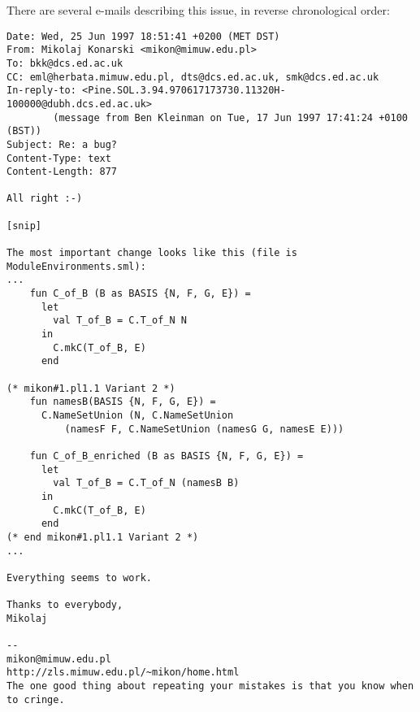 \documentclass[12pt,a4paper]{article}
\begin{document}
There are several e-mails describing this issue, in reverse chronological order:

{\small\begin{verbatim}
Date: Wed, 25 Jun 1997 18:51:41 +0200 (MET DST)
From: Mikolaj Konarski <mikon@mimuw.edu.pl>
To: bkk@dcs.ed.ac.uk
CC: eml@herbata.mimuw.edu.pl, dts@dcs.ed.ac.uk, smk@dcs.ed.ac.uk
In-reply-to: <Pine.SOL.3.94.970617173730.11320H-100000@dubh.dcs.ed.ac.uk>
        (message from Ben Kleinman on Tue, 17 Jun 1997 17:41:24 +0100 (BST))
Subject: Re: a bug?
Content-Type: text
Content-Length: 877

All right :-)

[snip]

The most important change looks like this (file is ModuleEnvironments.sml):
...
    fun C_of_B (B as BASIS {N, F, G, E}) =
      let
        val T_of_B = C.T_of_N N
      in
        C.mkC(T_of_B, E)
      end

(* mikon#1.pl1.1 Variant 2 *)   
    fun namesB(BASIS {N, F, G, E}) =
      C.NameSetUnion (N, C.NameSetUnion 
          (namesF F, C.NameSetUnion (namesG G, namesE E)))

    fun C_of_B_enriched (B as BASIS {N, F, G, E}) =
      let
        val T_of_B = C.T_of_N (namesB B)
      in
        C.mkC(T_of_B, E)
      end
(* end mikon#1.pl1.1 Variant 2 *)
...

Everything seems to work.

Thanks to everybody,
Mikolaj

-- 
mikon@mimuw.edu.pl
http://zls.mimuw.edu.pl/~mikon/home.html
The one good thing about repeating your mistakes is that you know when
to cringe.
\end{verbatim}}
\end{document}
